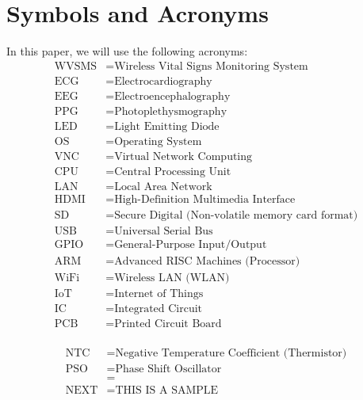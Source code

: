 
\chapter*{Symbols and  Acronyms}
  

\vspace{1cm}

In this paper, we  will  use the  following  acronyms:
\begin{align*}
\mbox{WVSMS} & =  \mbox{Wireless Vital Signs Monitoring System}    \\
\mbox{ECG} & =  \mbox{Electrocardiography}     \\
\mbox{EEG} & =  \mbox{Electroencephalography}     \\
\mbox{PPG} & =  \mbox{Photoplethysmography}    \\
\mbox{LED} & =  \mbox{Light Emitting Diode} \\
\mbox{OS} & =  \mbox{Operating System}	\\
\mbox{VNC} & =  \mbox{Virtual Network Computing}  \\
\mbox{CPU} & =  \mbox{Central Processing Unit}  \\
\mbox{LAN} & =  \mbox{Local Area Network}  \\
\mbox{HDMI} & =  \mbox{High-Definition Multimedia Interface}  \\
\mbox{SD} & =  \mbox{Secure Digital (Non-volatile memory card format)}  \\
\mbox{USB} & =  \mbox{Universal Serial Bus}  \\
\mbox{GPIO} & =  \mbox{General-Purpose Input/Output}  \\
\mbox{ARM} & =  \mbox{Advanced RISC Machines (Processor)}  \\
\mbox{WiFi} & =  \mbox{Wireless LAN (WLAN)}  \\
\mbox{IoT} & =  \mbox{Internet of Things}  \\
\mbox{IC} & =  \mbox{Integrated Circuit} \\
\mbox{PCB} & =  \mbox{Printed Circuit Board}  \\
\end{align*}


\begin{align*}
\mbox{NTC} & =  \mbox{Negative Temperature Coefficient (Thermistor)}  \\ 
\mbox{PSO} & =  \mbox{Phase Shift Oscillator}  \\ 
\mbox{} & =  \mbox{}  \\ 
\mbox{NEXT} & =  \mbox{THIS IS A SAMPLE} 
\end{align*}
